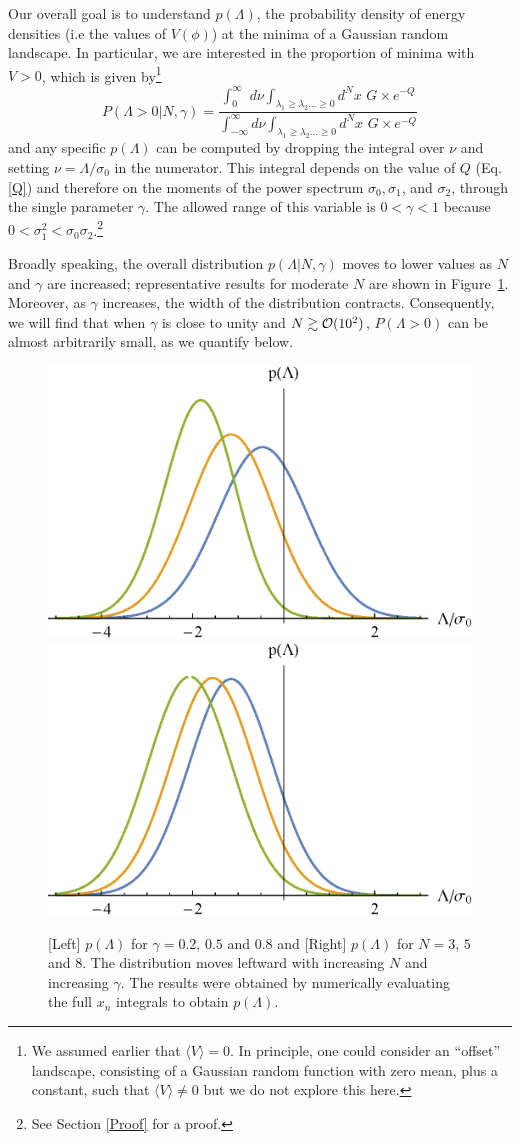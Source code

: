 \documentclass[12pt]{article}
\begin{document}
Our  overall goal is to understand $p(\Lambda)$, the probability density of energy densities (i.e the values of $V(\phi)$) at the minima of a Gaussian random landscape. In particular, we are interested in the proportion of  minima with $V > 0$, which is given by\footnote{We assumed earlier that $\langle V \rangle = 0$. In principle, one could consider an ``offset'' landscape, consisting of a Gaussian random function with zero mean, plus a constant, such that $\langle V \rangle \neq 0$ but we do not explore this here.}
\begin{equation} \label{PminIntegral}
  P(\Lambda >0| N,\gamma) =  \frac{\int^\infty_0 \,\,d\nu \int_{\lambda_1 \geq \lambda_2 \ldots \geq 0} d^Nx \,\, G \times e^{-Q} }{\int^\infty_{-\infty} d\nu \int_{\lambda_1 \geq \lambda_2 \ldots \geq 0} d^Nx\,\,G \times e^{-Q}}
  \end{equation}
 and any specific $p(\Lambda)$ can be computed by dropping the integral over $\nu$ and setting $\nu=\Lambda/\sigma_0$ in the numerator.  
%
This integral depends on the value of $Q$ (Eq. \ref{Q}) and therefore on the moments of the power spectrum $\sigma_0, \sigma_1$,  and $\sigma_2$, through the single parameter $\gamma$. The allowed range of this variable is $0<\gamma<1$ because $0<\sigma_1^2<\sigma_0\sigma_2$.\footnote{See Section \ref{Proof} for a proof.}


Broadly speaking, the overall distribution $p(\Lambda | N,\gamma)$ moves to lower values as $N$ and $\gamma$ are increased;  representative results for moderate $N$ are shown in Figure~\ref{distributions}. Moreover, as $\gamma$ increases, the width of the distribution contracts. Consequently, we will find that when $\gamma$ is close to unity and $N \gtrsim {\cal{O}}(10^2)$, $P(\Lambda >0)$ can be almost arbitrarily small, as we quantify below. 


\begin{figure}
  \centering
  \includegraphics[width=0.45 \linewidth]{PLam_gamma.eps}  \hfill
  \includegraphics[width=0.45 \linewidth]{PLam_N.eps}
  \caption{[Left] $p(\Lambda)$ for $\gamma = 0.2$, $0.5$ and $0.8$ and [Right] $p(\Lambda)$ for $N=3$, $5$ and $8$. The distribution moves leftward with increasing $N$ and increasing $\gamma$. The results were obtained by numerically evaluating the full $x_n$ integrals to obtain $p(\Lambda)$.}
  \label{distributions}
  \end{figure}
\end{document}
